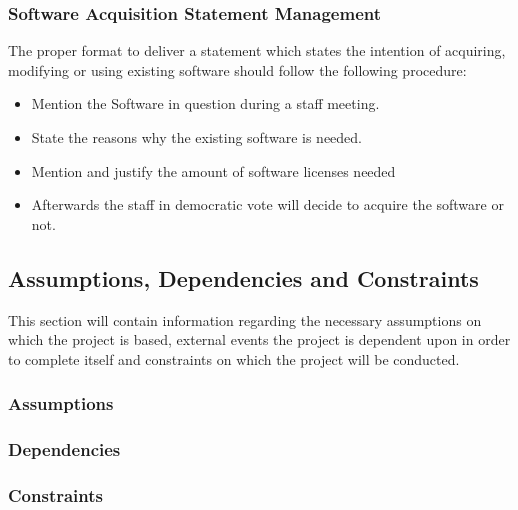 \documentclass[12pt]{article}
\begin{document}
\subsubsection{Software Acquisition Statement Management}
The proper format to deliver a statement which states the intention of acquiring, modifying or using existing software should follow the following procedure:

\begin{itemize}
  \item	Mention the Software in question during a staff meeting.
  \item State the reasons why the existing software is needed.
  \item Mention and justify the amount of software licenses needed
  \item Afterwards the staff in democratic vote will decide to acquire the software or not.
\end{itemize}

\subsection{Assumptions, Dependencies and Constraints}
This section will contain information regarding the necessary assumptions on which the project is based, external events the project is dependent upon in order to complete itself and constraints on which the project will be conducted. 

\subsubsection{Assumptions}

\subsubsection{Dependencies}

\subsubsection{Constraints}
\end{document}
